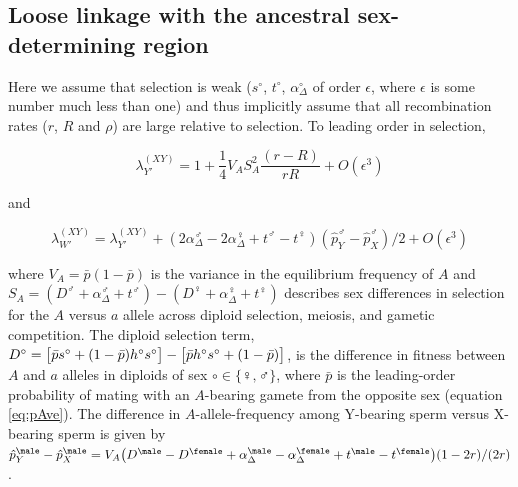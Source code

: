 \documentclass[10pt,letterpaper]{article}
\begin{document}
\subsection*{Loose linkage with the ancestral sex-determining region}

Here we assume that selection is weak ($s^\circ$, $t^\circ$, $\alpha_{\Delta}^\circ$ of order $\epsilon$, where $\epsilon$ is some number much less than one) and thus implicitly assume that all recombination rates ($r$, $R$ and $\rho$) are large relative to selection.
To leading order in selection,

\begin{equation}
\lambda_{Y'}^{(XY)} = 1 + \frac{1}{4}V_{A}S_{A}^2\frac{ \left( r-R \right) }{r R}+O\left(\epsilon^3 \right) 
\label{eq:lambda_neoY}
\end{equation}

\noindent 
and 

\begin{equation}
\lambda_{W'}^{(XY)} =\lambda_{Y'}^{(XY)}+\left(2\alpha_{\Delta}^\male-2\alpha_{\Delta}^\female+t^\male-t^\female \right) \left( \hat{p}^\male_Y-\hat{p}^\male_X \right)/2
+O\left(\epsilon^3 \right)
\label{eq:lambda_neoW}
\end{equation}

\noindent
where $V_{A}=\bar{p}(1-\bar{p})$ is the variance in the equilibrium frequency of $A$ and $S_{A}=(D^\male +\alpha_{\Delta}^\male+t^\male) - (D^\female+\alpha_{\Delta}^\female+t^\female)$ describes sex differences in selection for the $A$ versus $a$ allele across diploid selection, meiosis, and gametic competition.
The diploid selection term, $D^\circ=\big{[} \bar{p}s^\circ+(1-\bar{p})h^\circ s^\circ\big{]} -\big{[} \bar{p}h^\circ s^\circ+(1-\bar{p}) \big{]}$, is the difference in fitness between $A$ and $a$ alleles in diploids of sex $\circ \in \{\female,\male\}$, where $\bar{p}$ is the leading-order probability of mating with an $A$-bearing gamete from the opposite sex (equation \ref{eq:pAve}). 
The difference in $A$-allele-frequency among Y-bearing sperm versus X-bearing sperm is given by $\hat{p}^\male_Y-\hat{p}^\male_X=V_{A}\big{(}D^\male - D^\female+\alpha_{\Delta}^\male-\alpha_{\Delta}^\female+t^\male-t^\female\big{)}(1-2r)/(2r)$. 
\end{document}
